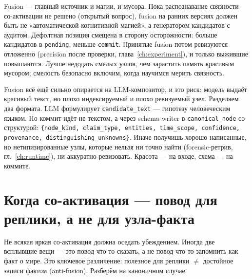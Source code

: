 \begin{principle}
Fusion --- главный источник и магии, и мусора. Пока распознавание связности
со-активации не решено (открытый вопрос), fusion на ранних версиях должен быть
не «автоматической когнитивной магией», а генератором кандидатов с аудитом.
Дефолтная позиция смещена в сторону осторожности: больше кандидатов в
\texttt{pending}, меньше \texttt{commit}. Принятые fusion потом ревизуются
отложенно (precision после проверки, глава~\ref{ch:experiment}), и только
выжившие повышаются. Лучше недодать смелых узлов, чем зарастить память красивым
мусором; смелость безопасно включим, когда научимся мерить связность.
\end{principle}

\begin{principle}
Fusion всё ещё сильно опирается на LLM-композитор, и это риск: модель выдаёт
красивый текст, но плохо индексируемый и плохо ревизуемый узел. Разделяем два
формата. LLM формулирует \texttt{candidate\_text} --- гипотезу человеческим
языком. Но коммит идёт не текстом, а через schema-writer в \texttt{canonical\_node}
со структурой:
\texttt{\{node\_kind, claim\_type, entities, time\_scope, confidence, provenance, distinguishing\_unknowns\}}.
Иначе получишь хорошо написанные, но нетипизированные узлы, которые нельзя ни
точно найти (forensic-ретрив, гл.~\ref{ch:runtime}), ни аккуратно ревизовать.
Красота --- на входе, схема --- на коммите.
\end{principle}

\section{Когда со-активация --- повод для реплики, а не для узла-факта}
\label{sec:antifusion-joke}

Не всякая яркая со-активация должна оседать убеждением. Иногда две всплывшие
вещи --- это повод что-то сказать, а не повод что-то запомнить как факт о мире.
Это ключевое различение: полезное для реплики $\neq$ достойное записи фактом
(anti-fusion). Разберём на каноничном случае.

